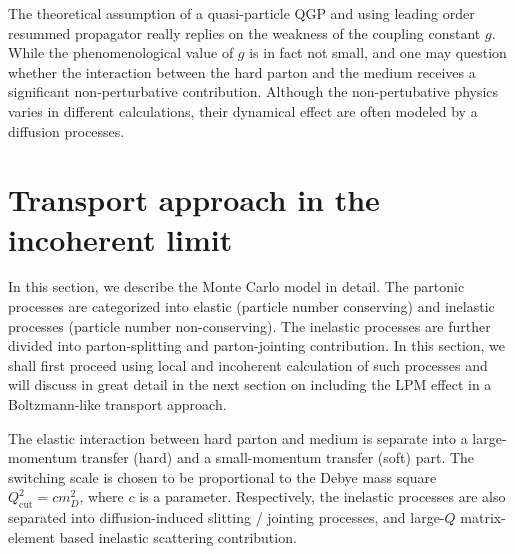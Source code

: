 The theoretical assumption of a quasi-particle QGP and using leading order resummed propagator really replies on the weakness of the coupling constant $g$. 
While the phenomenological value of $g$ is in fact not small, and one may question whether the interaction between the hard parton and the medium receives a significant non-perturbative contribution.
Although the non-pertubative physics varies in different calculations, their dynamical effect are often modeled by a diffusion processes.

\section{Transport approach in the incoherent limit}
In this section, we describe the Monte Carlo model in detail. The partonic processes are categorized into elastic (particle number conserving) and inelastic processes (particle number non-conserving). 
The inelastic processes are further divided into parton-splitting and parton-jointing contribution. 
In this section, we shall first proceed using local and incoherent calculation of such processes and will discuss in great detail in the next section on including the LPM effect in a Boltzmann-like transport approach.

The elastic interaction between hard parton and medium is separate into a large-momentum transfer (hard) and a small-momentum transfer (soft) part.
The switching scale is chosen to be proportional to the Debye mass square $Q_{\textrm{cut}}^2 = c m_D^2$, where $c$ is a parameter.
Respectively, the inelastic processes are also separated into diffusion-induced slitting / jointing processes, and large-$Q$ matrix-element based inelastic scattering contribution.


